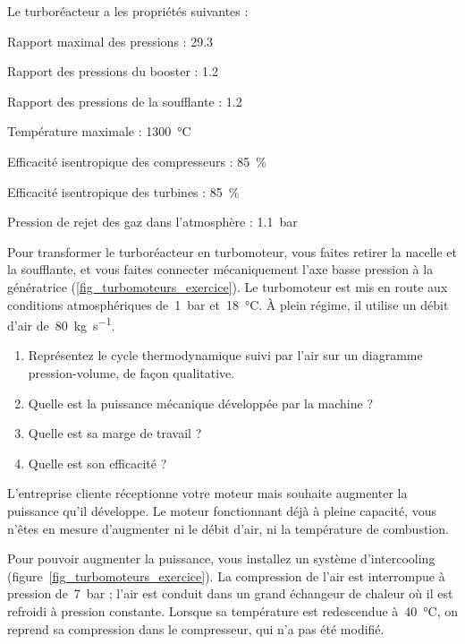 	Le turboréacteur a les propriétés suivantes :
		
	\begin{description}
		\item Rapport maximal des pressions : 						\tab \num{29,3}
		\item Rapport des pressions du booster : 					\tab \num{1,2}
		\item Rapport des pressions de la soufflante : 			\tab \num{1,2}
		\item Température maximale : 									\tab \SI{1300}{\degreeCelsius}
		\item Efficacité isentropique des compresseurs : 		\tab \SI{85}{\percent}
		\item Efficacité isentropique des turbines : 			\tab \SI{85}{\percent}
		\item Pression de rejet des gaz dans l’atmosphère : 	\tab \SI{1,1}{\bar}
	\end{description}

	Pour transformer le turboréacteur en turbomoteur, vous faites retirer la nacelle et la soufflante, et vous faites connecter mécaniquement l’axe basse pression à la génératrice (\cref{fig_turbomoteurs_exercice}). Le turbomoteur est mis en route aux conditions atmosphériques de~\SI{1}{\bar} et~\SI{18}{\degreeCelsius}. À plein régime, il utilise un débit d’air de~\SI{80}{\kilogram\per\second}.
	
	\begin{enumerate}
		\item Représentez le cycle thermodynamique suivi par l’air sur un diagramme pression-volume, de façon qualitative.
		\item Quelle est la puissance mécanique développée par la machine ?
		\item Quelle est sa marge de travail ?
		\item Quelle est son efficacité ?
	\end{enumerate}
	
	\onlyframabook{\pagebreak}%
	L’entreprise cliente réceptionne votre moteur mais souhaite augmenter la puissance qu’il développe. Le moteur fonctionnant déjà à pleine capacité, vous n’êtes en mesure d’augmenter ni le débit d’air, ni la température de combustion.
	
	Pour pouvoir augmenter la puissance, vous installez un système d’intercooling (figure~\ref{fig_turbomoteurs_exercice}). La compression de l’air est interrompue à pression de~\SI{7}{\bar} ; l’air est conduit dans un grand échangeur de chaleur où il est refroidi à pression constante. Lorsque sa température est redescendue à~\SI{40}{\celsius}, on reprend sa compression dans le compresseur, qui n’a pas été modifié.
	
